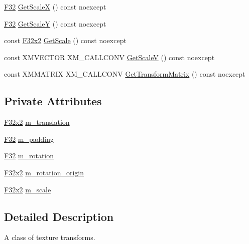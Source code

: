 \begin{DoxyCompactItemize}
\hyperlink{namespacemage_aa97e833b45f06d60a0a9c4fc22ae02c0}{F32} \hyperlink{classmage_1_1_texture_transform_a8aba9997f667007fb9b77e14031a1f00}{Get\+ScaleX} () const noexcept
\item 
\hyperlink{namespacemage_aa97e833b45f06d60a0a9c4fc22ae02c0}{F32} \hyperlink{classmage_1_1_texture_transform_a06a3314cef041f0070f7203e1538a2eb}{Get\+ScaleY} () const noexcept
\item 
const \hyperlink{namespacemage_aa87237ad091f5cd7da612b8523fc108f}{F32x2} \hyperlink{classmage_1_1_texture_transform_a822d0aac9ada61b2e8df0949b28fbff1}{Get\+Scale} () const noexcept
\item 
const X\+M\+V\+E\+C\+T\+OR X\+M\+\_\+\+C\+A\+L\+L\+C\+O\+NV \hyperlink{classmage_1_1_texture_transform_af8290a3e9db59677b9f2f217b464d625}{Get\+ScaleV} () const noexcept
\item 
const X\+M\+M\+A\+T\+R\+IX X\+M\+\_\+\+C\+A\+L\+L\+C\+O\+NV \hyperlink{classmage_1_1_texture_transform_a8463a5d1060614cd3a8847b527094fc0}{Get\+Transform\+Matrix} () const noexcept
\end{DoxyCompactItemize}
\subsection*{Private Attributes}
\begin{DoxyCompactItemize}
\item 
\hyperlink{namespacemage_aa87237ad091f5cd7da612b8523fc108f}{F32x2} \hyperlink{classmage_1_1_texture_transform_a1a8adc206e6b6f7e3ec255fc82e73524}{m\+\_\+translation}
\item 
\hyperlink{namespacemage_aa97e833b45f06d60a0a9c4fc22ae02c0}{F32} \hyperlink{classmage_1_1_texture_transform_a49845212aa6b85f73f9ca2101748bb13}{m\+\_\+padding}
\item 
\hyperlink{namespacemage_aa97e833b45f06d60a0a9c4fc22ae02c0}{F32} \hyperlink{classmage_1_1_texture_transform_aa9b56aac4354fa7f37caee42451f60d1}{m\+\_\+rotation}
\item 
\hyperlink{namespacemage_aa87237ad091f5cd7da612b8523fc108f}{F32x2} \hyperlink{classmage_1_1_texture_transform_af991dbcc669e2af4d78531b50fc60175}{m\+\_\+rotation\+\_\+origin}
\item 
\hyperlink{namespacemage_aa87237ad091f5cd7da612b8523fc108f}{F32x2} \hyperlink{classmage_1_1_texture_transform_adb36217d25494721ee54cd6807ea65af}{m\+\_\+scale}
\end{DoxyCompactItemize}


\subsection{Detailed Description}
A class of texture transforms. 


